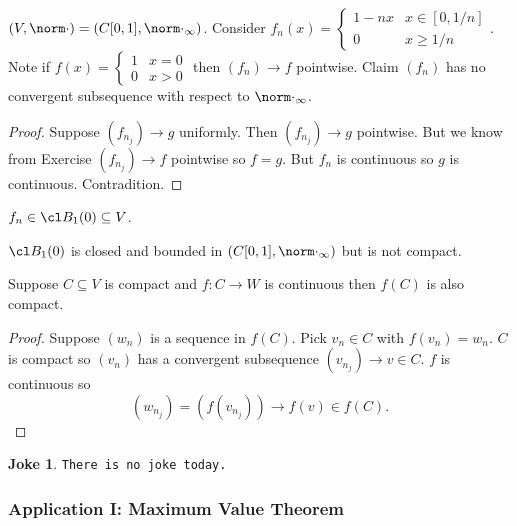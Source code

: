 \documentclass[a4paper]{article}
\theoremstyle{definition}
\newtheorem*{joke}{Joke}
\begin{document}
\begin{eg}
  \((V, \norm \cdot) = (C[0,1], \norm \cdot_\infty)\). Consider \(f_n(x) = \begin{cases} 1-nx & x\in[0,1/n] \\ 0 & x\geq 1/n \end{cases}\). Note if \(f(x) = \begin{cases} 1 & x=0 \\ 0 & x>0 \end{cases}\) then \((f_n) \to f\) pointwise. Claim \((f_n)\) has no convergent subsequence with respect to \(\norm \cdot_\infty\).

  \begin{proof}
    Suppose \((f_{n_j})\to g\) uniformly. Then \((f_{n_j})\to g\) pointwise. But we know from Exercise \((f_{n_j})\to f\) pointwise so \(f=g\). But \(f_n\) is continuous so \(g\) is continuous. Contradition.
  \end{proof}

  \begin{note}
    \(f_n\in \cl B_1(0) \subseteq V\).
  \end{note}
\end{eg}

\begin{corollary}
  \(\cl B_1(0)\) is closed and bounded in \((C[0,1], \norm \cdot_\infty)\) but is not compact.
\end{corollary}

\begin{proposition}
  Suppose \(C \subseteq V\) is compact and \(f:C\to W\) is continuous then \(f(C)\) is also compact.
\end{proposition}

\begin{proof}
  Suppose \((w_n)\) is a sequence in \(f(C)\). Pick \(v_n \in C\) with \(f(v_n) = w_n\). \(C\) is compact so \((v_n)\) has a convergent subsequence \((v_{n_j})\to v \in C\). \(f\) is continuous so
  \[
    (w_{n_j}) = (f(v_{n_j})) \to f(v) \in f(C).
  \]
\end{proof}

\begin{joke}
  \texttt{There is no joke today.}
\end{joke}

\subsubsection{Application I: Maximum Value Theorem}
\end{document}
